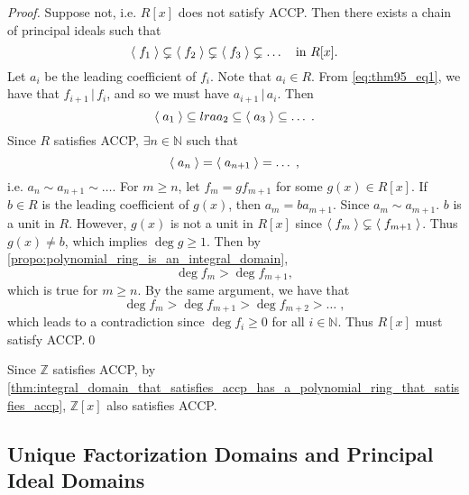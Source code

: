 \begin{proof}
  Suppose not, i.e. $R[x]$ does not satisfy ACCP. Then there exists a chain of principal ideals such that
  \begin{equation}\label{eq:thm95_eq1}
    \langle \; f_1 \; \rangle \subsetneq \langle \; f_2 \; \rangle \subsetneq \langle \; f_3 \; \rangle \subsetneq \hdots \quad \text{in } R[x].
  \end{equation}
  Let $a_i$ be the leading coefficient of $f_i$. Note that $a_i \in R$. From \cref{eq:thm95_eq1}, we have that $f_{i + 1} \, | \, f_i$, and so we must have $a_{i + 1} \, | \, a_i$. Then
  \begin{equation*}
    \langle \; a_1 \; \rangle \subseteq lra{a_2} \subseteq \langle \; a_3 \; \rangle \subseteq \hdots \;.
  \end{equation*}
  Since $R$ satisfies ACCP, $\exists n \in \mathbb{N}$ such that
  \begin{equation*}
    \langle \; a_n \; \rangle = \langle \; a_{n + 1} \; \rangle = \hdots \;,
  \end{equation*}
  i.e. $a_n \sim a_{n + 1} \sim \hdots$. For $m \geq n$, let $f_m = g f_{m + 1}$ for some $g(x) \in R[x]$. If $b \in R$ is the leading coefficient of $g(x)$, then $a_m = b a_{m + 1}$. Since $a_m \sim a_{m + 1}$. $b$ is a unit in $R$. However, $g(x)$ is not a unit in $R[x]$ since $\langle \; f_m \; \rangle \subsetneq \langle \; f_{m + 1} \; \rangle$. Thus $g(x) \neq b$, which implies $\deg g \geq 1$. Then by \cref{propo:polynomial_ring_is_an_integral_domain},
  \begin{equation*}
    \deg f_m > \deg f_{m + 1},
  \end{equation*}
  which is true for $m \geq n$. By the same argument, we have that
  \begin{equation*}
    \deg f_m > \deg f_{m + 1} > \deg f_{m + 2} > \hdots \;,
  \end{equation*}
  which leads to a contradiction since $\deg f_i \geq 0$ for all $i \in \mathbb{N}$. Thus $R[x]$ must satisfy ACCP.\qed
\end{proof}

\begin{eg}
  Since $\mathbb{Z}$ satisfies ACCP, by \cref{thm:integral_domain_that_satisfies_accp_has_a_polynomial_ring_that_satisfies_accp}, $\mathbb{Z}[x]$ also satisfies ACCP.
\end{eg}


\subsection{Unique Factorization Domains and Principal Ideal Domains}%
\label{sub:unique_factorization_domains_and_principal_ideal_domains}

